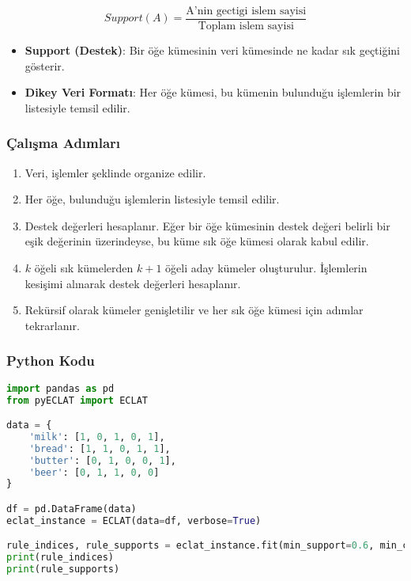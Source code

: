\[ Support(A) = \frac{\text{A'nin gectigi islem sayisi}}{\text{Toplam islem sayisi}} \]

\begin{itemize}
	\item \textbf{Support (Destek)}: Bir öğe kümesinin veri kümesinde ne kadar sık geçtiğini gösterir.
	\item \textbf{Dikey Veri Formatı}: Her öğe kümesi, bu kümenin bulunduğu işlemlerin bir listesiyle temsil edilir.
\end{itemize}

\subsubsection{Çalışma Adımları}

\begin{enumerate}
	\item Veri, işlemler şeklinde organize edilir.
	\item Her öğe, bulunduğu işlemlerin listesiyle temsil edilir.
	\item Destek değerleri hesaplanır. Eğer bir öğe kümesinin destek değeri belirli bir eşik değerinin üzerindeyse, bu küme sık öğe kümesi olarak kabul edilir.
	\item $k$ öğeli sık kümelerden $k+1$ öğeli aday kümeler oluşturulur. İşlemlerin kesişimi alınarak destek değerleri hesaplanır.
	\item Rekürsif olarak kümeler genişletilir ve her sık öğe kümesi için adımlar tekrarlanır.
\end{enumerate}

\subsubsection{Python Kodu}

\begin{lstlisting}[language=Python]
import pandas as pd
from pyECLAT import ECLAT

data = {
    'milk': [1, 0, 1, 0, 1],
    'bread': [1, 1, 0, 1, 1],
    'butter': [0, 1, 0, 0, 1],
    'beer': [0, 1, 1, 0, 0]
}

df = pd.DataFrame(data)
eclat_instance = ECLAT(data=df, verbose=True)

rule_indices, rule_supports = eclat_instance.fit(min_support=0.6, min_combination=1, max_combination=3)
print(rule_indices)
print(rule_supports)
\end{lstlisting}

\newpage